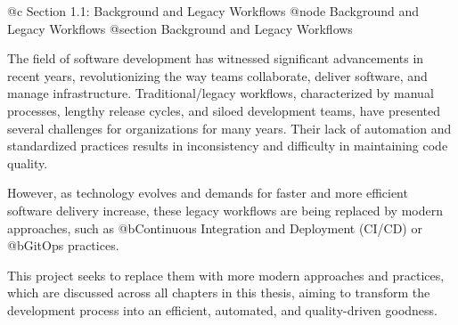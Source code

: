 @c Section 1.1: Background and Legacy Workflows
@node Background and Legacy Workflows
@section Background and Legacy Workflows

The field of software development has witnessed significant advancements in recent years, revolutionizing the way teams collaborate, deliver software, and manage infrastructure. Traditional/legacy workflows, characterized by manual processes, lengthy release cycles, and siloed development teams, have presented several challenges for organizations for many years. Their lack of automation and standardized practices results in inconsistency and difficulty in maintaining code quality.

However, as technology evolves and demands for faster and more efficient software delivery increase, these legacy workflows are being replaced by modern approaches, such as @b{Continuous Integration and Deployment (CI/CD)} or @b{GitOps} practices. 

This project seeks to replace them with more modern approaches and practices, which are discussed across all chapters in this thesis, aiming to transform the development process into an efficient, automated, and quality-driven goodness.
